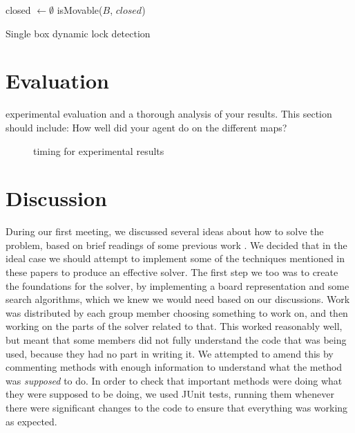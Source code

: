 \documentclass[a4paper,11pt]{article}
\begin{document}
\begin{algorithm}
  \DontPrintSemicolon
  closed $\longleftarrow \emptyset$
  \return isMovable($B$, $closed$)

\caption{Single box dynamic lock detection}
\label{alg:singledynamiclock}
\end{algorithm}

\section{Evaluation}
experimental evaluation and a thorough analysis of your results. This section should include:
How well did your agent do on the different maps?
\begin{figure}
  \centering

  \caption{timing for experimental results}
  \label{fig:exptime}
\end{figure}
\section{Discussion}
During our first meeting, we discussed several ideas about how to solve the
problem, based on brief readings of some previous work \cite{virkkala, jung}. We
decided that in the ideal case we should attempt to implement some of the
techniques mentioned in these papers to produce an effective solver. The first
step we too was to create the foundations for the solver, by implementing a
board representation and some search algorithms, which we knew we would need
based on our discussions. Work was distributed by each group member choosing
something to work on, and then working on the parts of the solver related to
that. This worked reasonably well, but meant that some members did not fully
understand the code that was being used, because they had no part in writing
it. We attempted to amend this by commenting methods with enough information to
understand what the method was \emph{supposed} to do. In order to check that
important methods were doing what they were supposed to be doing, we used JUnit
tests, running them whenever there were significant changes to the code to
ensure that everything was working as expected.
\end{document}
